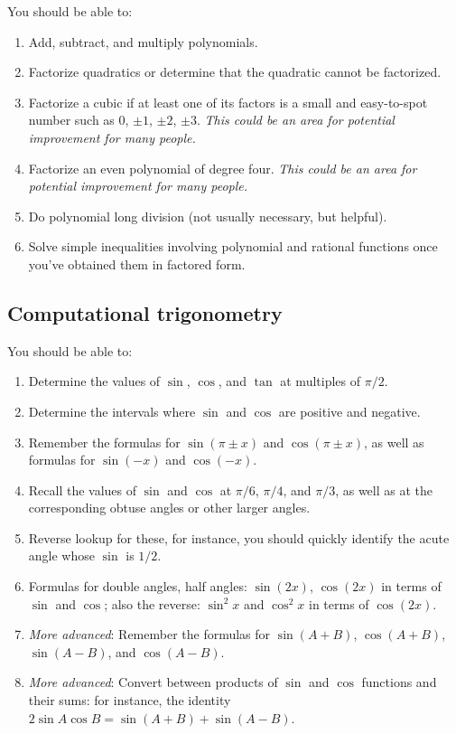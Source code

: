 \documentclass[10pt]{amsart}
\begin{document}
You should be able to:

\begin{enumerate}
\item Add, subtract, and multiply polynomials.
\item Factorize quadratics or determine that the quadratic cannot be
  factorized.
\item Factorize a cubic if at least one of its factors is a small and
  easy-to-spot number such as $0$, $\pm 1$, $\pm 2$, $\pm 3$. {\em
  This could be an area for potential improvement for many people.}
\item Factorize an even polynomial of degree four. {\em This could be
  an area for potential improvement for many people.}
\item Do polynomial long division (not usually necessary, but helpful).
\item Solve simple inequalities involving polynomial and rational
  functions once you've obtained them in factored form.
\end{enumerate}

\subsection{Computational trigonometry}

You should be able to:

\begin{enumerate}
\item Determine the values of $\sin$, $\cos$, and $\tan$ at multiples
  of $\pi/2$.
\item Determine the intervals where $\sin$ and $\cos$ are positive and
  negative.
\item Remember the formulas for $\sin(\pi \pm x )$ and $\cos(\pi \pm x)$,
  as well as formulas for $\sin(-x)$ and $\cos(-x)$.
\item Recall the values of $\sin$ and $\cos$ at $\pi/6$, $\pi/4$, and
  $\pi/3$, as well as at the corresponding obtuse angles or other
  larger angles.
\item Reverse lookup for these, for instance, you should quickly
  identify the acute angle whose $\sin$ is $1/2$.
\item Formulas for double angles, half angles: $\sin(2x)$, $\cos(2x)$
  in terms of $\sin$ and $\cos$; also the reverse: $\sin^2x$ and
  $\cos^2x$ in terms of $\cos(2x)$.
\item {\em More advanced}: Remember the formulas for $\sin(A + B)$,
  $\cos(A + B)$, $\sin(A - B)$, and $\cos(A - B)$.
\item {\em More advanced}: Convert between products of $\sin$ and
  $\cos$ functions and their sums: for instance, the identity $2\sin A
  \cos B = \sin(A + B) + \sin (A - B)$.
\end{enumerate}
\end{document}
